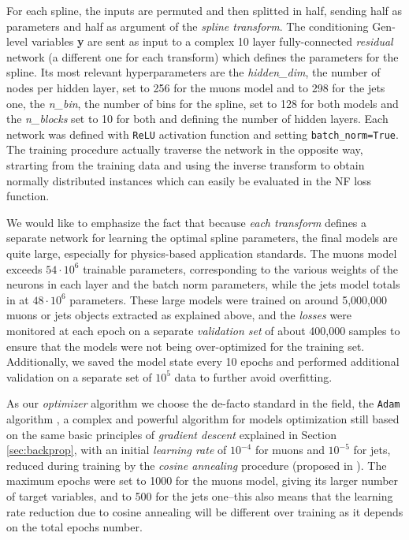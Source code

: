 For each spline, the inputs are permuted and then splitted in half, sending half as parameters and half as argument of the \emph{spline transform}. The conditioning Gen-level variables \textbf{y} are sent as input to a complex 10 layer fully-connected \emph{residual} network (a different one for each transform) which defines the parameters for the spline. Its most relevant hyperparameters are the \emph{hidden\_dim}, the number of nodes per hidden layer, set to 256 for the muons model and to 298 for the jets one, the \emph{n\_bin}, the number of bins for the spline, set to 128 for both models and the \emph{n\_blocks} set to 10 for both and defining the number of hidden layers.
Each network was defined with \texttt{ReLU} activation function and setting \texttt{batch\_norm=True}. The training procedure actually traverse the network in the opposite way, strarting from the training data and using the inverse transform to obtain normally distributed instances which can easily be evaluated in the NF loss function.

We would like to emphasize the fact that because \emph{each transform} defines a separate network for learning the optimal spline parameters, the final models are quite large, especially for physics-based application standards. The muons model exceeds $54\cdot 10^6$ trainable parameters, corresponding to the various weights of the neurons in each layer and the batch norm parameters, while the jets model totals in at $48\cdot 10^6$ parameters. These large models were trained on around 5,000,000 muons or jets objects extracted as explained above, and the \emph{losses} were monitored at each epoch on a separate \emph{validation set} of about 400,000 samples to ensure that the models were not being over-optimized for the training set. Additionally, we saved the model state every 10 epochs and performed additional validation on a separate set of $10^5$ data to further avoid overfitting.

As our \emph{optimizer} algorithm we choose the de-facto standard in the field, the \texttt{Adam} algorithm \cite{https://doi.org/10.48550/arxiv.1412.6980}, a complex and powerful algorithm for models optimization still based on the same basic principles of \emph{gradient descent} explained in Section \ref{sec:backprop}, with an initial \emph{learning rate} of $10^{-4}$ for muons and $10^{-5}$ for jets, reduced during training by the \emph{cosine annealing} procedure (proposed in \cite{https://doi.org/10.48550/arxiv.1608.03983}). The maximum epochs were set to 1000 for the muons model, giving its larger number of target variables, and to 500 for the jets one--this also means that the learning rate reduction due to cosine annealing will be different over training as it depends on the total epochs number.

